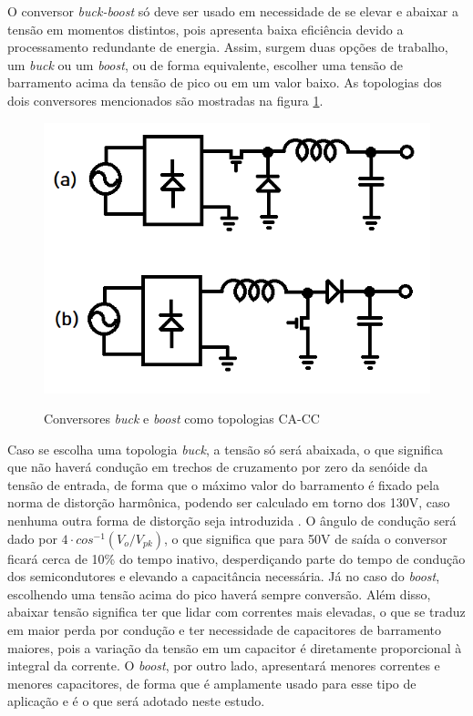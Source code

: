 \documentclass[
        12pt,
        openany, %
        oneside, %
        a4paper,			
        english,			
        brazil
        ]{abntbibufjf}
\begin{document}
O conversor \textit{buck-boost} só deve ser usado em necessidade de se elevar e abaixar a tensão em momentos distintos, pois apresenta baixa eficiência devido a processamento redundante de energia. Assim, surgem duas opções de trabalho, um \textit{buck} ou um \textit{boost}, ou de forma equivalente, escolher uma tensão de barramento acima da tensão de pico ou em um valor baixo. As topologias dos dois conversores mencionados são mostradas na figura \ref{buck_and_boost}.

\begin{figure}[h]
	\centering
	\caption{Conversores \textit{buck} e \textit{boost} como topologias CA-CC}
	\includegraphics[scale=.8]{../ESQUEMAS/buck_and_boost.png}\\
	\label{buck_and_boost}
\end{figure}

Caso se escolha uma topologia \textit{buck}, a tensão só será abaixada, o que significa que não haverá condução em trechos de cruzamento por zero da senóide da tensão de entrada, de forma que o máximo valor do barramento é fixado pela norma de distorção harmônica, podendo ser calculado em torno dos 130V, caso nenhuma outra forma de distorção seja introduzida \cite{guilherme-dissert}. O ângulo de condução será dado por $4\cdot cos^{-1}(V_o/V_{pk})$, o que significa que para 50V de saída o conversor ficará cerca de 10\% do tempo inativo, desperdiçando parte do tempo de condução dos semicondutores e elevando a capacitância necessária. Já no caso do \textit{boost}, escolhendo uma tensão acima do pico haverá sempre conversão. Além disso, abaixar tensão significa ter que lidar com correntes mais elevadas, o que se traduz em maior perda por condução e ter necessidade de capacitores de barramento maiores, pois a variação da tensão em um capacitor é diretamente proporcional à integral da corrente. O \textit{boost}, por outro lado, apresentará menores correntes e menores capacitores, de forma que é amplamente usado para esse tipo de aplicação e é o que será adotado neste estudo.
\end{document}
